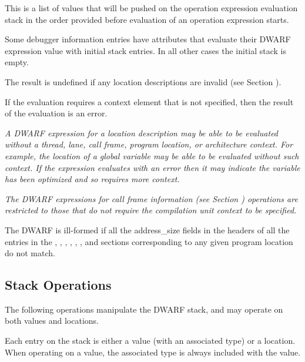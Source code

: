 \begin{enumerate}[1. ]

This is a list of values that will be pushed on the operation
expression evaluation stack in the order provided before evaluation of
an operation expression starts.

Some debugger information entries have attributes that evaluate their
DWARF expression value with initial stack entries. In all other cases
the initial stack is empty.

The result is undefined if any location descriptions are invalid (see
Section ).
\end{enumerate}

If the evaluation requires a context element that is not specified,
then the result of the evaluation is an error.

\textit{A DWARF expression for a location description may be able to
be evaluated without a thread, lane, call frame, program location,
or architecture context. For example, the location of a global
variable may be able to be evaluated without such context. If the
expression evaluates with an error then it may indicate the variable
has been optimized and so requires more context.}

\textit{The DWARF expressions for call frame information (see Section
) operations are restricted
to those that do not require the compilation unit context to be
specified.}

The DWARF is ill-formed if all the address\_size fields in the headers
of all the entries in the \dotdebuginfo, \dotdebugaddr, \dotdebugline,
\dotdebugrnglists{}, \dotdebugrnglistsdwo{}, \dotdebugloclists{}, and
\dotdebugloclistsdwo{} sections corresponding to any given program
location do not match.

\subsection{Stack Operations}
\label{chap:stackoperations}
The following 
operations manipulate the DWARF stack, and may operate on both values
and locations.

Each entry on the stack is either a value (with an associated type) or
a location. When operating on a value, the associated type is always
included with the value.

